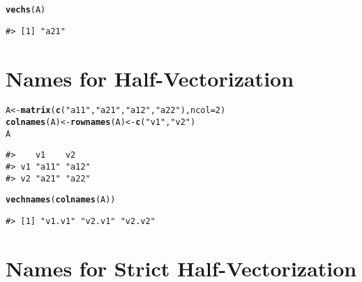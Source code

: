 \documentclass{article}\usepackage[]{graphicx}\usepackage[]{color}
\makeatletter
\newcommand{\hlnum}[1]{\textcolor[rgb]{0.686,0.059,0.569}{#1}}%
\newcommand{\hlstr}[1]{\textcolor[rgb]{0.192,0.494,0.8}{#1}}%
\newcommand{\hlstd}[1]{\textcolor[rgb]{0.345,0.345,0.345}{#1}}%
\newcommand{\hlkwb}[1]{\textcolor[rgb]{0.69,0.353,0.396}{#1}}%
\newcommand{\hlkwc}[1]{\textcolor[rgb]{0.333,0.667,0.333}{#1}}%
\newcommand{\hlkwd}[1]{\textcolor[rgb]{0.737,0.353,0.396}{\textbf{#1}}}%
\newenvironment{kframe}{%
 \def\at@end@of@kframe{}%
 \ifinner\ifhmode%
  \def\at@end@of@kframe{\end{minipage}}%
  \begin{minipage}{\columnwidth}%
 \fi\fi%
 \def\FrameCommand##1{\hskip\@totalleftmargin \hskip-\fboxsep
 \colorbox{shadecolor}{##1}\hskip-\fboxsep
     \hskip-\linewidth \hskip-\@totalleftmargin \hskip\columnwidth}%
 \MakeFramed {\advance\hsize-\width
   \@totalleftmargin\z@ \linewidth\hsize
   \@setminipage}}%
 {\par\unskip\endMakeFramed%
 \at@end@of@kframe}
\newenvironment{knitrout}{}{} %
\makeatother
\begin{document}
\begin{knitrout}
\color{fgcolor}\begin{kframe}
\begin{alltt}
\hlkwd{vechs}\hlstd{(A)}
\end{alltt}
\begin{verbatim}
#> [1] "a21"
\end{verbatim}
\end{kframe}
\end{knitrout}

\newpage

\section*{Names for Half-Vectorization}

\begin{knitrout}
\color{fgcolor}\begin{kframe}
\begin{alltt}
\hlstd{A} \hlkwb{<-} \hlkwd{matrix}\hlstd{(}\hlkwd{c}\hlstd{(}\hlstr{"a11"}\hlstd{,} \hlstr{"a21"}\hlstd{,} \hlstr{"a12"}\hlstd{,} \hlstr{"a22"}\hlstd{),} \hlkwc{ncol} \hlstd{=} \hlnum{2}\hlstd{)}
\hlkwd{colnames}\hlstd{(A)} \hlkwb{<-} \hlkwd{rownames}\hlstd{(A)} \hlkwb{<-} \hlkwd{c}\hlstd{(}\hlstr{"v1"}\hlstd{,} \hlstr{"v2"}\hlstd{)}
\hlstd{A}
\end{alltt}
\begin{verbatim}
#>    v1    v2   
#> v1 "a11" "a12"
#> v2 "a21" "a22"
\end{verbatim}
\end{kframe}
\end{knitrout}

\begin{knitrout}
\color{fgcolor}\begin{kframe}
\begin{alltt}
\hlkwd{vechnames}\hlstd{(}\hlkwd{colnames}\hlstd{(A))}
\end{alltt}
\begin{verbatim}
#> [1] "v1.v1" "v2.v1" "v2.v2"
\end{verbatim}
\end{kframe}
\end{knitrout}

\newpage

\section*{Names for Strict Half-Vectorization}
\end{document}
